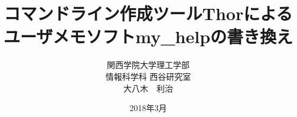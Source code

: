 \title{コマンドライン作成ツールThorによるユーザメモソフトmy_helpの書き換え\\}
\author{関西学院大学理工学部\\情報科学科 西谷研究室\\ 大八木　利治\\}
\date{2018年3月}

\maketitle
\newpage
